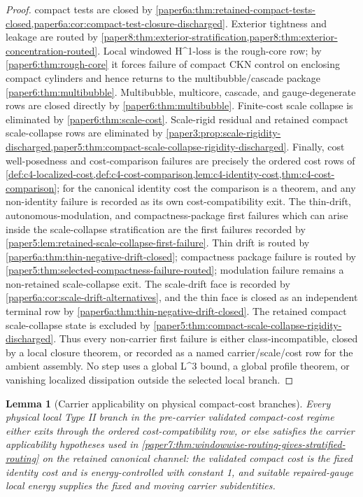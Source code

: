 \documentclass[11pt]{amsart}
\def\({}%
\def\){}%
\theoremstyle{plain}
\newtheorem{lemma}[lemma]{Lemma}
\theoremstyle{definition}
\theoremstyle{remark}
\begin{document}
\begin{proof}
compact tests are closed by
\cref{paper6a:thm:retained-compact-tests-closed,paper6a:cor:compact-test-closure-discharged}.
Exterior tightness and leakage are routed by
\cref{paper8:thm:exterior-stratification,paper8:thm:exterior-concentration-routed}.
Local windowed \(H^1\)-loss is the
rough-core row; by \cref{paper6:thm:rough-core} it forces failure of compact
CKN control on enclosing compact cylinders and hence returns to the
multibubble/cascade package \cref{paper6:thm:multibubble}.  Multibubble,
multicore, cascade, and gauge-degenerate rows are closed directly by
\cref{paper6:thm:multibubble}.  Finite-cost scale collapse is eliminated by
\cref{paper6:thm:scale-cost}.  Scale-rigid residual and retained compact
scale-collapse rows are eliminated by
\cref{paper3:prop:scale-rigidity-discharged,paper5:thm:compact-scale-collapse-rigidity-discharged}.
Finally, cost well-posedness and cost-comparison failures are precisely the
ordered cost rows of
\cref{def:c4-localized-cost,def:c4-cost-comparison,lem:c4-identity-cost,thm:c4-cost-comparison};
for the canonical identity cost the comparison is a theorem, and any
non-identity failure is recorded as its own cost-compatibility exit.
The thin-drift, autonomous-modulation, and compactness-package first failures
which can arise inside the scale-collapse stratification are the first failures
recorded by \cref{paper5:lem:retained-scale-collapse-first-failure}.  Thin
drift is routed by \cref{paper6a:thm:thin-negative-drift-closed}; compactness
package failure is routed by
\cref{paper5:thm:selected-compactness-failure-routed}; modulation failure
remains a non-retained scale-collapse exit.  The scale-drift face is recorded
by \cref{paper6a:cor:scale-drift-alternatives}, and the thin face is closed as
an independent terminal row by \cref{paper6a:thm:thin-negative-drift-closed}.
The retained compact scale-collapse state is excluded by
\cref{paper5:thm:compact-scale-collapse-rigidity-discharged}.
Thus every non-carrier first failure is either class-incompatible, closed by a
local closure theorem, or recorded as a named carrier/scale/cost row for the
ambient assembly.  No step uses a global \(L^3\) bound, a global profile
theorem, or vanishing localized dissipation outside the selected local branch.
\end{proof}

\begin{lemma}[Carrier applicability on physical compact-cost branches]
\label{paper7:lem:ambient-carrier-applicability}
Every physical local Type II branch in the pre-carrier validated compact-cost
regime either exits through the ordered cost-compatibility row, or else
satisfies the carrier applicability hypotheses used in
\cref{paper7:thm:windowwise-routing-gives-stratified-routing} on the retained
canonical channel: the validated compact cost is the fixed identity cost and is
energy-controlled with constant \(1\), and suitable repaired-gauge local energy
supplies the fixed and moving carrier subidentities.
\end{lemma}
\end{document}
